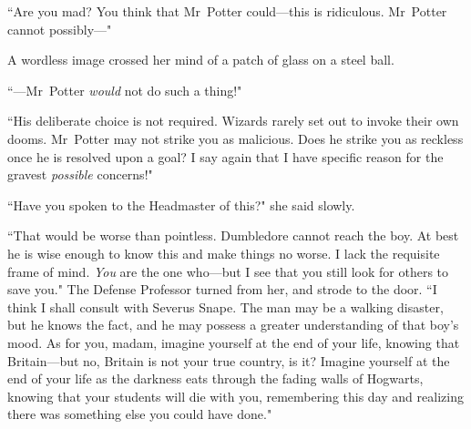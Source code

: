 ``Are you mad? You think that Mr~Potter could—this is ridiculous. Mr~Potter cannot possibly—"

A wordless image crossed her mind of a patch of glass on a steel ball.

``—Mr~Potter \emph{would} not do such a thing!"

``His deliberate choice is not required. Wizards rarely set out to invoke their own dooms. Mr~Potter may not strike you as malicious. Does he strike you as reckless once he is resolved upon a goal? I say again that I have specific reason for the gravest \emph{possible} concerns!"

``Have you spoken to the Headmaster of this?" she said slowly.

``That would be worse than pointless. Dumbledore cannot reach the boy. At best he is wise enough to know this and make things no worse. I lack the requisite frame of mind. \emph{You} are the one who—but I see that you still look for others to save you." The Defense Professor turned from her, and strode to the door. ``I think I shall consult with Severus Snape. The man may be a walking disaster, but he knows the fact, and he may possess a greater understanding of that boy's mood. As for you, madam, imagine yourself at the end of your life, knowing that Britain—but no, Britain is not your true country, is it? Imagine yourself at the end of your life as the darkness eats through the fading walls of Hogwarts, knowing that your students will die with you, remembering this day and realizing there was something else you could have done."


